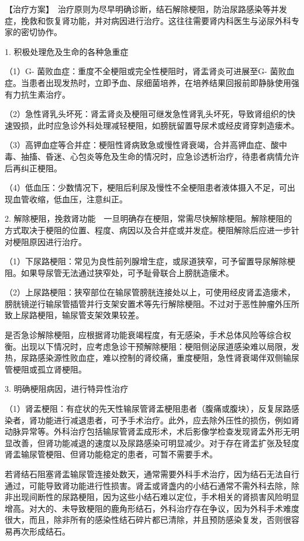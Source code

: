 【治疗方案】　治疗原则为尽早明确诊断，结石解除梗阻，防治尿路感染等并发症，挽救和恢复肾功能，并对病因进行治疗。这往往需要肾内科医生与泌尿外科专家的密切协作。

1. 积极处理危及生命的各种急重症

（1）G{-} 菌败血症：重度不全梗阻或完全性梗阻时，肾盂肾炎可进展至G{-}
菌败血症。当患者出现发热时，立即予血、尿细菌培养，在培养结果回报前即静脉使用强有力抗生素治疗。

（2）急性肾乳头坏死：肾盂肾炎及梗阻可继发急性肾乳头坏死，导致肾组织的快速毁损，此时应急诊外科处理减轻梗阻，如膀胱留置导尿术或经皮肾穿刺造瘘术。

（3）高钾血症等合并症：梗阻性肾病致急或慢性肾衰竭，合并高钾血症、酸中毒、抽搐、昏迷、心包炎等危及生命的情况时，应急诊透析治疗，待患者病情允许后再纠正梗阻。

（4）低血压：少数情况下，梗阻后利尿及慢性不全梗阻患者液体摄入不足，可出现血管收缩，低血压，注意纠正。

2.
解除梗阻，挽救肾功能　一旦明确存在梗阻，常需尽快解除梗阻。解除梗阻的方式取决于梗阻的位置、程度、病因以及合并症或并发症。梗阻解除后应进一步针对梗阻原因进行治疗。

（1）下尿路梗阻：常见为良性前列腺增生症，或尿道狭窄，可予留置导尿解除梗阻。如果导尿管无法通过狭窄处，可予耻骨联合上膀胱造瘘术。

（2）上尿路梗阻：狭窄部位在输尿管膀胱连接处以上，可使用经皮肾盂造瘘术，膀胱镜逆行输尿管插管并行支架安置术等先行解除梗阻。不过对于恶性肿瘤外压所致上尿路梗阻，输尿管支架效果较差。

是否急诊解除梗阻，应根据肾功能衰竭程度，有无感染，手术总体风险等综合权衡。出现以下情况时，应考虑急诊干预解除梗阻：梗阻侧泌尿道感染难以局限，发热，尿路感染源性败血症，难以控制的肾绞痛，重度梗阻，急性肾衰竭伴双侧输尿管梗阻或孤立肾梗阻。

3. 明确梗阻病因，进行特异性治疗

（1）肾盂梗阻：有症状的先天性输尿管肾盂梗阻患者（腹痛或腹块），反复尿路感染者，肾功能进行减退患者，可予手术治疗。此外，应去除外压性的损伤，例如肾动脉异常等。外科治疗包括输尿管肾盂成形术，术后影像学检查发现肾盂外形无明显改善，但肾功能减退的速度以及尿路感染可明显减少。对于存在肾盂扩张及轻度肾盂输尿管梗阻、但肾功能稳定的患者，可暂不需要手术。

若肾结石阻塞肾盂输尿管连接处数天，通常需要外科手术治疗，因为结石无法自行通过，可能导致肾功能进行性损害。肾盂或肾盏内的小结石通常不需外科去除，除非出现间断性的尿路梗阻，因为这些小结石难以定位，手术相关的肾损害风险明显增高。对大的、未导致梗阻的鹿角形结石，外科治疗存在争议，因为外科手术难度很大，而且，除非所有的感染性结石碎片都已清除，并且预防感染复发，否则很容易再次形成结石。

